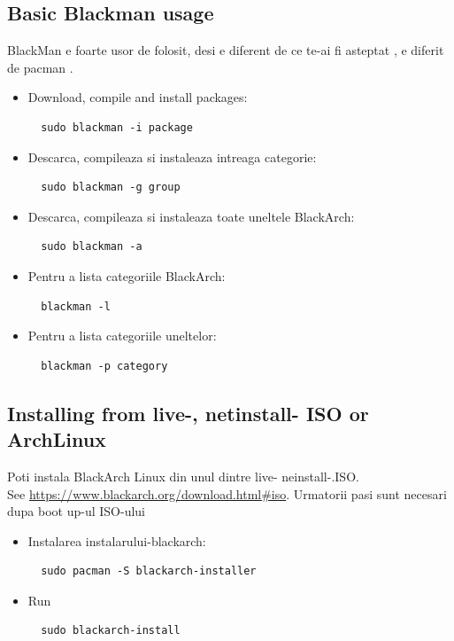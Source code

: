 \documentclass[a4paper, oneside, 11pt]{book}
\begin{document}
\subsection{Basic Blackman usage} BlackMan e foarte usor de folosit, desi e diferent de ce te-ai fi asteptat , e diferit de pacman .
\begin{itemize}
\item Download, compile and install packages:
\begin{lstlisting}
  sudo blackman -i package
\end{lstlisting}

\item Descarca, compileaza si instaleaza intreaga categorie:
\begin{lstlisting}
  sudo blackman -g group
\end{lstlisting}

\item Descarca, compileaza si instaleaza toate uneltele BlackArch:
\begin{lstlisting}
  sudo blackman -a
\end{lstlisting}

\item Pentru a lista categoriile BlackArch:
\begin{lstlisting}
  blackman -l
\end{lstlisting}

\item Pentru a lista categoriile uneltelor:
\begin{lstlisting}
  blackman -p category
\end{lstlisting}

\end{itemize}

\subsection{Installing from live-, netinstall- ISO or ArchLinux}
Poti instala BlackArch Linux din unul dintre live- neinstall-.ISO.\\See
\url{https://www.blackarch.org/download.html#iso}. Urmatorii pasi sunt necesari dupa boot up-ul ISO-ului
\begin{itemize}
\item Instalarea instalarului-blackarch:
\begin{lstlisting}
  sudo pacman -S blackarch-installer
\end{lstlisting}

\item Run
\begin{lstlisting}
  sudo blackarch-install
\end{lstlisting}

\end{itemize}
\end{document}
